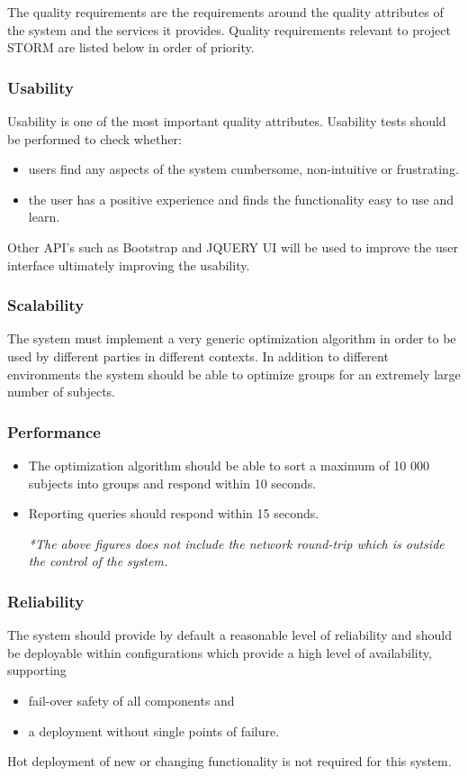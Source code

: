 The quality requirements are the requirements around the quality attributes of the system and
the services it provides. Quality requirements relevant to project STORM are listed below in order of priority. \par

\subsubsection{Usability} \label{3.2.1}
Usability is one of the most important quality attributes. Usability tests should be performed to check whether:
\begin{itemize}
\item users find any aspects of the system cumbersome, non-intuitive or frustrating.
\item the user has a positive experience and finds the functionality easy to use and learn.
\end{itemize}
Other API's such as Bootstrap and JQUERY UI will be used to improve the user interface ultimately improving the usability.

\subsubsection{Scalability} \label{3.2.2}
The system must implement a very generic optimization algorithm in order to be used by different parties in different contexts. In addition to different environments the system should be able to optimize groups for an extremely large number of subjects.

\subsubsection{Performance} \label{3.2.3}
\begin{itemize}
\item The optimization algorithm should be able to sort a maximum of 10 000 subjects into groups and respond within 10 seconds.
\item Reporting queries should respond within 15 seconds. \par
\textit {*The above figures does not include the network round-trip which is outside the control of the system.}
\end{itemize}

\subsubsection{Reliability} \label{3.2.4}
The system should provide by default a reasonable level of reliability and should be deployable within configurations which provide a high level of availability, supporting
\begin{itemize}
\item fail-over safety of all components and
\item a deployment without single points of failure.
\end{itemize}
Hot deployment of new or changing functionality is not required for this system.

